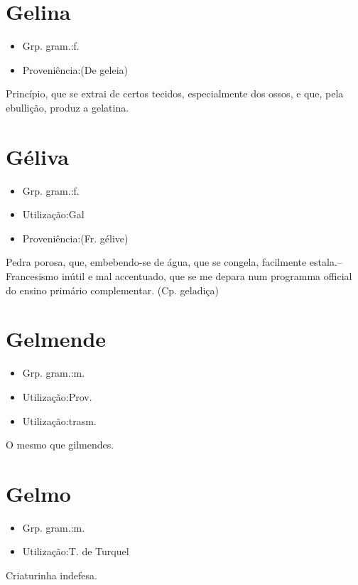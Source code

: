 \section{Gelina}
\begin{itemize}
\item {Grp. gram.:f.}
\end{itemize}
\begin{itemize}
\item {Proveniência:(De \textunderscore geleia\textunderscore )}
\end{itemize}
Princípio, que se extrai de certos tecidos, especialmente dos ossos, e que, pela ebullição, produz a gelatina.
\section{Géliva}
\begin{itemize}
\item {Grp. gram.:f.}
\end{itemize}
\begin{itemize}
\item {Utilização:Gal}
\end{itemize}
\begin{itemize}
\item {Proveniência:(Fr. \textunderscore gélive\textunderscore )}
\end{itemize}
Pedra porosa, que, embebendo-se de água, que se congela, facilmente estala.--Francesismo inútil e mal accentuado, que se me depara num programma official do ensino primário complementar.
(Cp. \textunderscore geladiça\textunderscore )
\section{Gelmende}
\begin{itemize}
\item {Grp. gram.:m.}
\end{itemize}
\begin{itemize}
\item {Utilização:Prov.}
\end{itemize}
\begin{itemize}
\item {Utilização:trasm.}
\end{itemize}
O mesmo que \textunderscore gilmendes\textunderscore .
\section{Gelmo}
\begin{itemize}
\item {Grp. gram.:m.}
\end{itemize}
\begin{itemize}
\item {Utilização:T. de Turquel}
\end{itemize}
Criaturinha indefesa.
